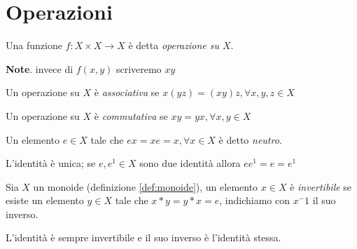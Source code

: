         \section{Operazioni}
            \begin{definition}
                Una funzione $f: X\times X \rightarrow X$ è detta \emph{operazione su $X$}.
            \end{definition}
            \textbf{Note}. invece di $f(x,y)$ scriveremo $xy$
            \begin{definition}[Associatività]
                Un operazione su $X$ è \emph{associativa} se $x(yz) = (xy)z, \forall x,y,z \in X$
            \end{definition}
            \begin{definition}[Commutatività]
                Un operazione su $X$ è \emph{commutativa} se $xy = yx, \forall x,y \in X$
            \end{definition}
            \begin{definition}
                Un elemento $e \in X$ tale che $ex=xe=x, \forall x \in X$ è detto \emph{neutro}.
            \end{definition}
            \begin{property}
                L'identità è unica; se $e,e^1 \in X$ sono due identità allora $ee^1=e=e^1$
            \end{property}
            \begin{definition}
                Sia $X$ un monoide (definizione \ref{def:monoide}), un elemento $x \in X$ è \emph{invertibile} se esiste un elemento $y \in X$
                tale che $x*y=y*x=e$, indichiamo con $x^-1$ il suo inverso.
            \end{definition}
            \begin{property}
                L'identità è sempre invertibile e il suo inverso è l'identità stessa.
            \end{property}
